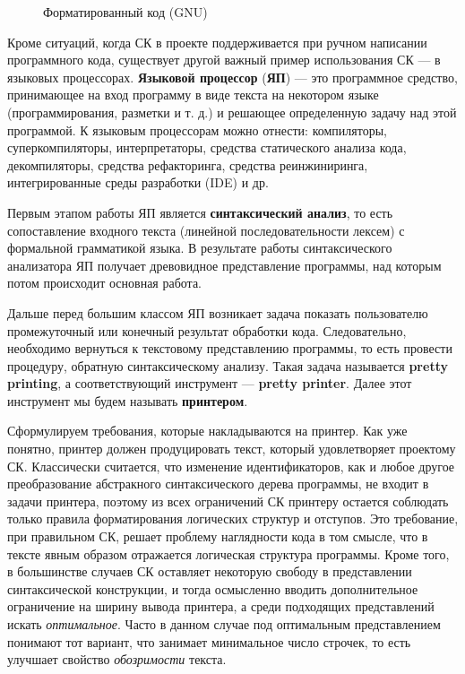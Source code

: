 \begin{figure}[h!]
	\centering
	
  \caption{Форматированный код (GNU)}
	\label{fig:wikiExGNU}
\end{figure}

Кроме ситуаций, когда СК в проекте поддерживается при ручном написании
программного кода, существует другой важный пример использования СК ---
в языковых процессорах. \textbf{Языковой процессор} (\textbf{ЯП}) ---
это программное средство, принимающее на вход программу в виде текста
на некотором языке (программирования, разметки и т. д.) и решающее
определенную задачу над этой программой. К языковым процессорам можно
отнести: компиляторы, суперкомпиляторы, интерпретаторы,
средства статического анализа кода, декомпиляторы, средства рефакторинга,
средства реинжиниринга, интегрированные среды разработки (IDE) и др.

Первым этапом работы ЯП является \textbf{синтаксический анализ}, то есть
сопоставление входного текста (линейной последовательности лексем) с формальной
грамматикой языка. В результате работы синтаксического анализатора ЯП получает
древовидное представление программы, над которым потом происходит основная работа.

Дальше перед большим классом ЯП возникает задача показать пользователю
промежуточный или конечный результат обработки кода.
Следовательно, необходимо вернуться к текстовому представлению программы,
то есть провести процедуру, обратную синтаксическому анализу. Такая задача
называется \textbf{pretty printing}, а соответствующий инструмент ---
\textbf{pretty printer}. Далее этот инструмент мы будем называть
\textbf{принтером}.

Сформулируем требования, которые накладываются на принтер.
Как уже понятно, принтер должен
продуцировать текст, который удовлетворяет проектому СК.
Классически считается, что изменение идентификаторов, как и любое другое
преобразование абстракного синтаксического дерева программы, не входит в
задачи принтера, поэтому из всех ограничений СК принтеру остается 
соблюдать только правила форматирования логических структур и отступов.
Это требование, при правильном СК, решает проблему наглядности кода в том смысле,
что в тексте явным образом отражается логическая структура программы.
Кроме того, в большинстве случаев СК оставляет некоторую свободу в представлении
синтаксической конструкции, и тогда осмысленно вводить дополнительное
ограничение на ширину вывода принтера, а среди подходящих представлений
искать \textit{оптимальное}. Часто в данном случае под
оптимальным представлением понимают тот вариант,
что занимает минимальное число строчек,
то есть улучшает свойство \textit{обозримости} текста.

